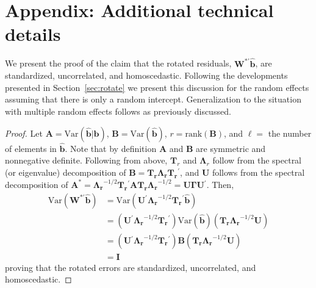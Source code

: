 \documentclass[12pt]{article} %
\newcommand{\trans}{\ensuremath{^\prime}}
\newcommand{\var}{\ensuremath{\mathrm{Var}}}
\begin{document}



\section*{Appendix: Additional technical details}

We present the proof of the claim that the rotated residuals, $\bm{W}^{*\prime} \widehat{\bm{b}}$, are standardized, uncorrelated, and homoscedastic. Following the developments presented in Section~\ref{sec:rotate} we present this discussion for the random effects assuming that there is only a random intercept. Generalization to the situation with multiple random effects follows as previously discussed.

\begin{proof}
 Let $\bm{A} = \var(\widehat{\bm{b}} | \bm{b})$, $\bm{B} = \var(\widehat{\bm{b}})$, $r = \text{rank}(\bm{B})$, and $\ell = $ the number of elements in $\widehat{\bm{b}}$. Note that by definition $\bm{A}$ and $\bm{B}$ are symmetric and nonnegative definite. Following from above, $\bm{T}_r$ and $\bm{\Lambda}_r$ follow from the spectral (or eigenvalue) decomposition of $\bm{B} = \bm{T_r \Lambda_r T_r}\trans$, and $\bm{U}$ follows from the spectral decomposition of $\bm{A^*} = \bm{\Lambda_r}^{-1/2} \bm{T_r}\trans \bm{A T_r \Lambda_r}^{-1/2} = \bm{U} \bm{\Gamma} \bm{U}\trans$. Then, 
\begin{align*}
\var(\bm{W}^{*\prime} \widehat{\bm{b}}) &= \var(\bm{U}\trans \bm{\Lambda_r}^{-1/2} \bm{T_r}\trans \widehat{\bm{b}})\\
&= (\bm{U}\trans \bm{\Lambda_r}^{-1/2} \bm{T_r}\trans) \var(\widehat{\bm{b}}) (\bm{T_r \Lambda_r}^{-1/2} \bm{U})\\
&= (\bm{U}\trans \bm{\Lambda_r}^{-1/2} \bm{T_r}\trans) \bm{B} (\bm{T_r \Lambda_r}^{-1/2} \bm{U})\\
&= \bm{I}
\end{align*}
proving that the rotated errors are standardized, uncorrelated, and homoscedastic.
\end{proof}
 
\end{document}
